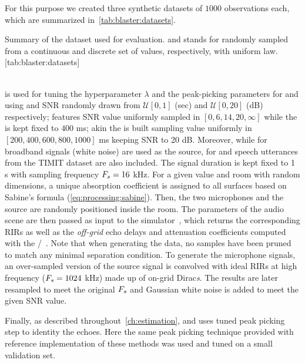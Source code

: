 \mynewline
For this purpose we created three synthetic datasets of $1000$ observations each, which are summarized in~\cref{tab:blaster:datasets}.
\begin{table}[ht]
    \begin{sidecaption}[]{
        Summary of the dataset used for evaluation.  and  stands for randomly sampled from a continuous and discrete set of values, respectively, with uniform law.
    }[tab:blaster:datasets]
    \centering
    \small
    
    \end{sidecaption}
\end{table}
\\\dsetValid{} is used for tuning the hyperparameter $\lambda$ and the peak-picking parameters for \algoCrocco{} and \algoBsn{} using \RT{} and SNR randomly drawn from $\mathcal{U}[0, 1]$ (sec) and $\mathcal{U}[0, 20]$ (dB) respectively; \dsetSNR{} features SNR value uniformly sampled in $[0, 6, 14, 20, \infty]$ while the \RT{} is kept fixed to $400$ ms; akin the \dsetRT{} is built sampling \RT{} value uniformly in $[200, 400, 600, 800, 1000]$ ms keeping SNR to 20 dB.
Moreover, while for \dsetValid{} broadband signals (white noise) are used as the source, for \dsetSNR{} and \dsetRT{} speech utterances from the TIMIT dataset are also included.
The signal duration is kept fixed to 1 s with sampling frequency $F_s = 16$ kHz.
For a given \RT{} value and room with random dimensions, a unique absorption coefficient is assigned to all surfaces based on Sabine's formula (\cref{eq:processing:sabine}).
Then, the two microphones and the source are randomly positioned inside the room.
The parameters of the audio scene are then passed as input to the \pyroomacoustics{} simulator~, which returns the corresponding \acp{RIR} as well as the \textit{off-grid} echo delays and attenuation coefficients computed with the \ISMdef/~.
Note that when generating the data, no samples have been pruned to match any minimal separation condition.
To generate the microphone signals, an over-sampled version of the source signal is convolved with ideal \acp{RIR} at high frequency ($F_s=1024$ kHz) made up of on-grid Dirac\textit{s}.
The results are later resampled to meet the original $F_s$ and Gaussian white noise is added to meet the given SNR value.

\mynewline
Finally, as described throughout~\cref{ch:estimation}, \algoCrocco{} and \algoBsn{} uses tuned peak picking step to identity the echoes.
Here the same peak picking technique provided with reference implementation of these methods was used and tuned on a small validation set.


